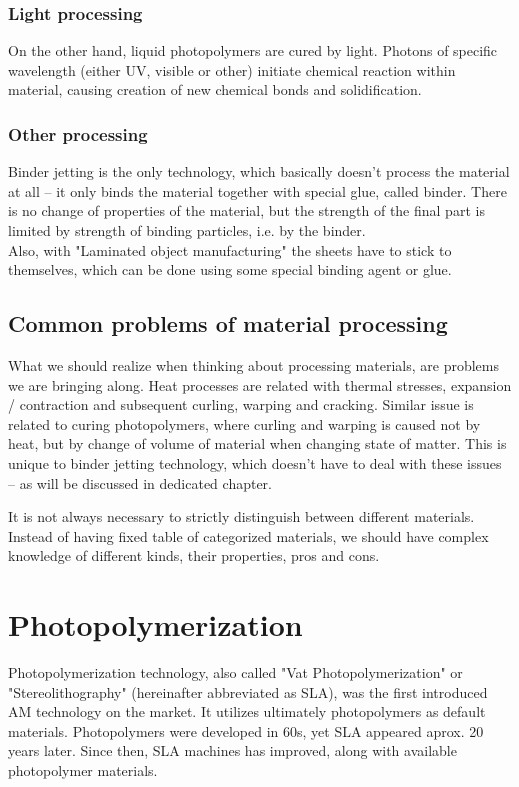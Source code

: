 \documentclass[a4paper, twoside, 11pt]{report}
\begin{document}
\subsection{Light processing}
On the other hand, liquid photopolymers are cured by light. Photons of specific wavelength (either UV, visible or other) initiate chemical reaction within material, causing creation of new chemical bonds and solidification.
\subsection{Other processing}
Binder jetting is the only technology, which basically doesn't process the material at all – it only binds the material together with special glue, called binder. There is no change of properties of the material, but the strength of the final part is limited by strength of binding particles, i.e. by the binder.\\
Also, with "Laminated object manufacturing" the sheets have to stick to themselves, which can be done using some special binding agent or glue.

\section{Common problems of material processing}
What we should realize when thinking about processing materials, are problems we are bringing along. Heat processes are related with thermal stresses, expansion / contraction and subsequent curling, warping and cracking. Similar issue is related to curing photopolymers, where curling and warping is caused not by heat, but by change of volume of material when changing state of matter. This is unique to binder jetting technology, which doesn't have to deal with these issues – as will be discussed in dedicated chapter.

	It is not always necessary to strictly distinguish between different materials. Instead of having fixed table of categorized materials, we should have complex knowledge of different kinds, their properties, pros and cons. 

\chapter{Photopolymerization}
Photopolymerization technology, also called "Vat Photopolymerization" or "Stereolithography" (hereinafter abbreviated as SLA), was the first introduced AM technology on the market. It utilizes ultimately photopolymers as default materials. Photopolymers were developed in 60s, yet SLA appeared aprox. 20 years later. Since then, SLA machines has improved, along with available photopolymer materials.
\end{document}
